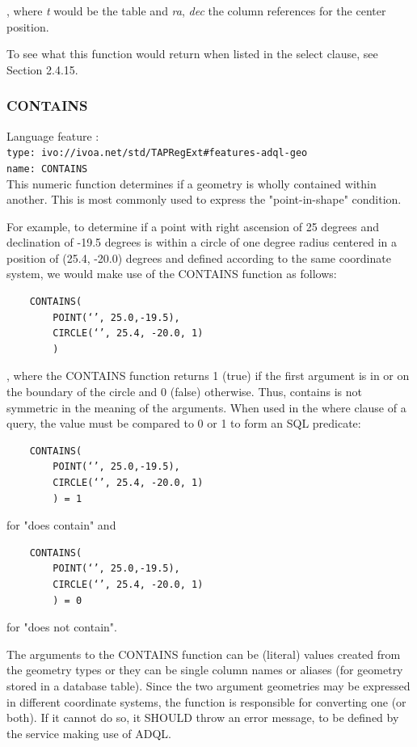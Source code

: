 \documentclass[11pt,a4paper]{ivoa}
\begin{document}
, where \textit{t} would be the table and \textit{ra}, \textit{dec} the
column references for the center position.

To see what this function would return when listed in the select clause, see
Section 2.4.15.

\subsubsection{CONTAINS}
\label{sec:geom.functions.contains}
{\footnotesize Language feature :}\\
{\footnotesize \verb|type: ivo://ivoa.net/std/TAPRegExt#features-adql-geo|}\\
{\footnotesize \verb|name: CONTAINS|}\\

This numeric function determines if a geometry is wholly contained within
another. This is most commonly used to express the "point-in-shape" condition.

For example, to determine if a point with right ascension of 25 degrees
and declination of -19.5 degrees is within a circle of one degree radius
centered in a position of (25.4, -20.0) degrees and defined according to the
same coordinate system, we would make use of the CONTAINS function as follows:

\begin{verbatim}
    CONTAINS(
        POINT(‘’, 25.0,-19.5),
        CIRCLE(‘’, 25.4, -20.0, 1)
        )
\end{verbatim}

, where the CONTAINS function returns 1 (true) if the first argument is in
or on the boundary of the circle and 0 (false) otherwise. Thus, contains is
not symmetric in the meaning of the arguments. When used in the where clause
of a query, the value must be compared to 0 or 1 to form an SQL predicate:

\begin{verbatim}
    CONTAINS(
        POINT(‘’, 25.0,-19.5),
        CIRCLE(‘’, 25.4, -20.0, 1)
        ) = 1
\end{verbatim}

for "does contain" and

\begin{verbatim}
    CONTAINS(
        POINT(‘’, 25.0,-19.5),
        CIRCLE(‘’, 25.4, -20.0, 1)
        ) = 0
\end{verbatim}

for "does not contain".

The arguments to the CONTAINS function can be (literal) values created
from the geometry types or they can be single column names or aliases (for
geometry stored in a database table). Since the two argument geometries may
be expressed in different coordinate systems, the function is responsible
for converting one (or both). If it cannot do so, it SHOULD throw an error
message, to be defined by the service making use of ADQL.
\end{document}
